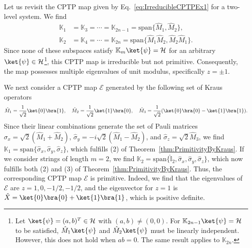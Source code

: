 \documentclass[preprint,pteplogo]{ptephy_v2}%
\numberwithin{equation}{section}
\theoremstyle{definition}
\newcommand{\mc}[1]{\mathcal{#1}}
\newcommand{\mbb}[1]{\mathbb{#1}}
\begin{document}
Let us revisit the CPTP map given by Eq.~\eqref{eq:IrreducibleCPTPEx1} for a two-level system.
We find
\begin{align}
\mbb{K}_1 &= \mbb{K}_3 = \cdots = \mbb{K}_{2n-1} = \textrm{span} \{ \hat{M}_1, \hat{M}_2 \}, \\
\mbb{K}_2 &= \mbb{K}_4 = \cdots = \mbb{K}_{2n} = \textrm{span} \{ \hat{M}_1 \hat{M}_2, \hat{M}_2 \hat{M}_1 \}.
\end{align}
Since none of these subspaces satisfy $\mbb{K}_m \ket{\psi} = \mc{H}$ for an arbitrary $\ket{\psi} \in \mc{H}$\footnote{
Let $\ket{\psi} = (a, b)^T \in \mc{H}$ with $(a,b) \neq (0,0)$.
For $\mbb{K}_{2n-1} \ket{\psi} = \mc{H}$ to be satisfied, $\hat{M}_1 \ket{\psi}$ and $\hat{M}_2 \ket{\psi}$ must be linearly independent.
However, this does not hold when $ab = 0$.
The same result applies to $\mbb{K}_{2n}$.
}, this CPTP map is irreducible but not primitive.
Consequently, the map possesses multiple eigenvalues of unit modulus, specifically $z=\pm1$.

We next consider a CPTP map $\mc{E}$ generated by the following set of Kraus operators
\begin{align}
\hat{M}_1 = \frac{1}{\sqrt{2}} \ket{0} \bra{1}, \quad
\hat{M}_2 = \frac{1}{\sqrt{2}} \ket{1} \bra{0}, \quad
\hat{M}_3 = \frac{1}{\sqrt{2}} (\ket{0} \bra{0} -\ket{1} \bra{1}).
\end{align}
Since their linear combinations generate the set of Pauli matrices $\hat{\sigma}_x = \sqrt{2}(\hat{M}_1+\hat{M}_2)$, $\hat{\sigma}_y = -i\sqrt{2}(\hat{M}_1-\hat{M}_2)$, and $\hat{\sigma}_z = \sqrt{2} \hat{M}_3$, we find $\mbb{K}_1 = \textrm{span} \{ \hat{\sigma}_x, \hat{\sigma}_y, \hat{\sigma}_z \}$, which fulfills (2) of Theorem~\ref{thm:PrimitivityByKraus}.
If we consider strings of length $m=2$, we find $\mathbb{K}_2 = \textrm{span} \{ \hat{\mbb{I}}_2, \hat{\sigma}_x, \hat{\sigma}_y, \hat{\sigma}_z \}$, which now fulfills both (2) and (3) of Theorem~\ref{thm:PrimitivityByKraus}.
Thus, the corresponding CPTP map $\mc{E}$ is primitive.
Indeed, we find that the eigenvalues of $\mc{E}$ are $z = 1, 0, -1/2, -1/2$, and the eigenvector for $z=1$ is $\hat{X} = \ket{0} \bra{0} + \ket{1} \bra{1}$, which is positive definite.
\end{document}
